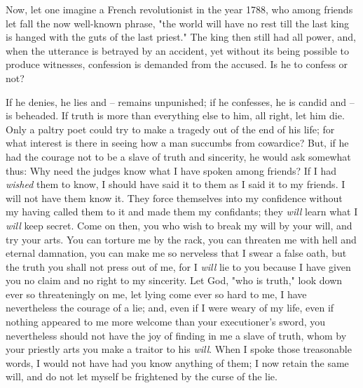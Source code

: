 \documentclass[a4paper]{book}
\begin{document}
Now, let one imagine a French revolutionist in the year 1788, who among 
friends let fall the now well-known phrase, "{}the world will have no rest 
till the last king is hanged with the guts of the last priest."{} The king 
then still had all power, and, when the utterance is betrayed by an accident, 
yet without its being possible to produce witnesses, confession is demanded 
from the accused. Is he to confess or not?

If he denies, he lies and -- remains unpunished; if he confesses, he is candid 
and -- is beheaded. If truth is more than everything else to him, all right, 
let him die. Only a paltry poet could try to make a tragedy out of the end of 
his life; for what interest is there in seeing how a man succumbs from 
cowardice? But, if he had the courage not to be a slave of truth and 
sincerity, he would ask somewhat thus: Why need the judges know what I have 
spoken among friends? If I had \textit{wished} them to know, I should have 
said it to them as I said it to my friends. I will not have them know it. They 
force themselves into my confidence without my having called them to it and 
made them my confidants; they \textit{will} learn what I \textit{will} keep 
secret. Come on then, you who wish to break my will by your will, and try your 
arts. You can torture me by the rack, you can threaten me with hell and 
eternal damnation, you can make me so nerveless that I swear a false oath, but 
the truth you shall not press out of me, for I \textit{will} lie to you 
because I have given you no claim and no right to my sincerity. Let God, 
"{}who is truth,"{} look down ever so threateningly on me, let lying come ever 
so hard to me, I have nevertheless the courage of a lie; and, even if I were 
weary of my life, even if nothing appeared to me more welcome than your 
executioner's sword, you nevertheless should not have the joy of finding in me 
a slave of truth, whom by your priestly arts you make a traitor to his 
\textit{will}. When I spoke those treasonable words, I would not have had you 
know anything of them; I now retain the same will, and do not let myself be 
frightened by the curse of the lie.
\end{document}
